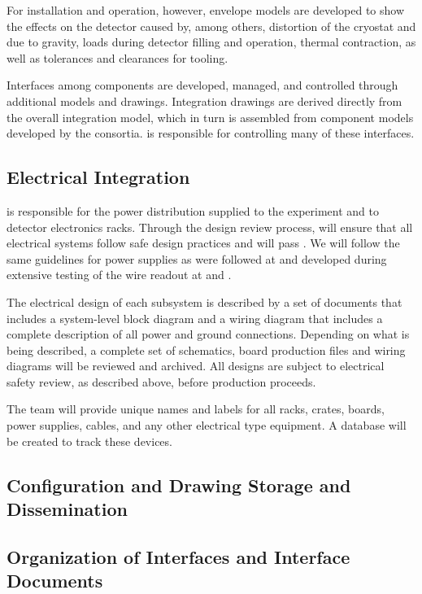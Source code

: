 For installation and operation, however, envelope models  are developed to 
show the effects on the detector 
caused by, among others, distortion of the cryostat and  due to gravity, loads  during 
detector filling and operation, thermal contraction,  as well as tolerances and clearances for tooling.

Interfaces among components are developed, managed, and controlled through additional models and drawings. 
Integration drawings are derived directly from the overall
integration model, which in turn is assembled from
component models developed by the consortia.
 is responsible for controlling many of these interfaces. 

\subsection{Electrical Integration}
\label{sec:es-tc-elec}

 is responsible for the  power
distribution supplied to the experiment and to detector electronics
racks.  Through the design review process,  will  ensure 
that all electrical systems  follow safe design practices and
will pass . We will follow the same  guidelines\cite{bib:cernedms2095958} for  power supplies as
were followed at  and developed during extensive testing of
the  wire readout at  and .  

The electrical design of each subsystem is described by a set of
documents that includes a system-level block diagram and a wiring
diagram that includes a complete description of all power and ground
connections.  Depending on what is being described, a complete set of
schematics, board production files and wiring diagrams will be
reviewed and archived.  All designs are subject to electrical safety
review, as described above, before production proceeds. 

The  team will provide unique names and labels
for all racks, crates, boards, power supplies, cables, and any other
electrical type equipment.  A database will be created to track these
devices.

\subsection{Configuration and Drawing Storage and Dissemination}
\subsection{Organization of Interfaces and Interface Documents}

